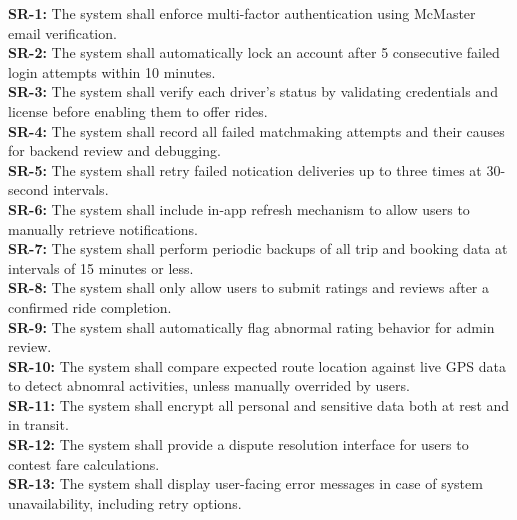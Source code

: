 \documentclass{article}
\begin{document}
\noindent \textbf{SR-1:} The system shall enforce multi-factor authentication using McMaster email verification. \\

\noindent \textbf{SR-2:} The system shall automatically lock an account after 5 consecutive failed login attempts within 10 minutes. \\

\noindent \textbf{SR-3:} The system shall verify each driver's status by validating credentials and license before enabling them to offer rides. \\

\noindent \textbf{SR-4:} The system shall record all failed matchmaking attempts and their causes for backend review and debugging. \\

\noindent \textbf{SR-5:} The system shall retry failed notication deliveries up to three times at 30-second intervals. \\

\noindent \textbf{SR-6:} The system shall include in-app refresh mechanism to allow users to manually retrieve notifications. \\

\noindent \textbf{SR-7:} The system shall perform periodic backups of all trip and booking data at intervals of 15 minutes or less. \\

\noindent \textbf{SR-8:} The system shall only allow users to submit ratings and reviews after a confirmed ride completion. \\

\noindent \textbf{SR-9:} The system shall automatically flag abnormal rating behavior for admin review. \\

\noindent \textbf{SR-10:} The system shall compare expected route location against live GPS data to detect abnomral activities, unless manually overrided by users. \\

\noindent \textbf{SR-11:} The system shall encrypt all personal and sensitive data both at rest and in transit.\\

\noindent \textbf{SR-12:} The system shall provide a dispute resolution interface for users to contest fare calculations. \\

\noindent \textbf{SR-13:} The system shall display user-facing error messages in case of system unavailability, including retry options. \\
\end{document}
